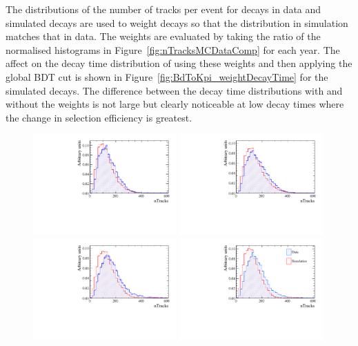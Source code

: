 The distributions of the number of tracks per event for \bdkpi decays in data and simulated decays are used to weight \bdkpi decays so that the distribution in simulation matches that in data. The weights are evaluated by taking the ratio of the normalised histograms in Figure~\ref{fig:nTracksMCDataComp} for each year. The affect on the decay time distribution of using these weights and then applying the global BDT cut is shown in Figure~\ref{fig:BdToKpi_weightDecayTime} for the simulated \bdkpi decays. The difference between the decay time distributions with and without the weights is not large but clearly noticeable at low decay times where the change in selection efficiency is greatest. 


\begin{figure}[tbp]
  \centering
    \includegraphics[width=0.49\textwidth]{./Figs/LifetimeMeasurement/Bd2KPi_2011_data_MC_nTracks.pdf}
    \includegraphics[width=0.49\textwidth]{./Figs/LifetimeMeasurement/Bd2KPi_2012_data_MC_nTracks.pdf}
    \includegraphics[width=0.49\textwidth]{./Figs/LifetimeMeasurement/Bd2KPi_2015_data_MC_nTracks.pdf}
    \includegraphics[width=0.49\textwidth]{./Figs/LifetimeMeasurement/Bd2KPi_2016_data_MC_nTracks.pdf}

\end{figure}

